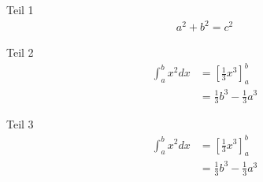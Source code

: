 Teil 1
\begin{align*}
    a^{2} + b^{2} = c^{2}
\end{align*}

Teil 2
\begin{align*}
    \int_{a}^{b} x^{2}dx &= \left[ \frac{1}{3}x^{3} \right]_{a}^{b}\\
    &= \frac{1}{3}b^{3} - \frac{1}{3}a^{3}
\end{align*}

Teil 3
\begin{align*}
    \int_{a}^{b} x^{2}dx &= \left[ \frac{1}{3}x^{3} \right]_{a}^{b}\\
    &= \frac{1}{3}b^{3} - \frac{1}{3}a^{3}
\end{align*}